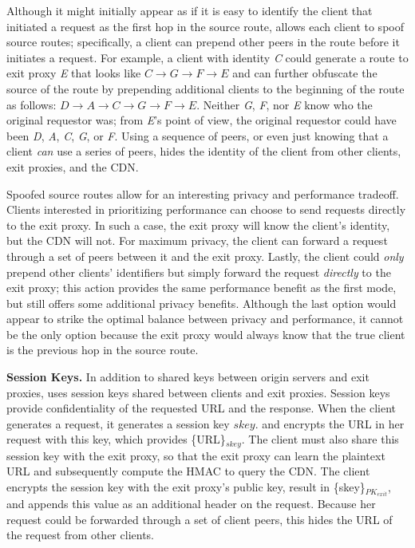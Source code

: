 Although it might initially appear as if it is easy to identify the client
that initiated a request as the first hop in the source route, \system{}
allows each client to spoof source routes; specifically, a client can prepend
other peers in the route before it initiates a request.  For example, a client
with identity {\it C} could generate a route to exit proxy {\it E} that looks
like $C \rightarrow G \rightarrow F \rightarrow E$ and can further obfuscate
the source of the route by prepending additional clients to the beginning of
the route as follows: $D \rightarrow A \rightarrow C \rightarrow G \rightarrow
F \rightarrow E$. Neither {\it G}, {\it F}, nor {\it E} know who the original requestor was; from {\it E}'s point of 
view, the original requestor could have been {\it D}, {\it A}, {\it C}, {\it G},
or {\it F}.  Using a sequence of 
peers, or even just knowing that a client {\it can} use a series of peers, hides
the identity of the client 
from other clients, exit proxies, and the CDN. 

Spoofed source routes allow for an interesting privacy and performance tradeoff. Clients interested in prioritizing performance can choose to send requests directly to the exit proxy. In such a case, the exit proxy will know the client's identity, but the CDN will not. For maximum privacy, the client can forward a request through a set of peers between it and the exit proxy. Lastly, the client could {\it only} prepend other clients' identifiers but simply forward the request {\em directly} to the exit proxy; this action provides the same performance benefit as the first mode, but still offers some additional privacy benefits. Although the last option would appear to strike the optimal balance between privacy and performance, it cannot be the only option because the exit proxy would always know that the true client is the previous hop in the source route. %


\textbf{Session Keys.}
In addition to shared keys between origin servers and exit proxies, \system{} uses session keys shared 
between clients and exit proxies.  Session keys provide confidentiality of the requested URL and the 
response.  When the client generates a request, it generates a session key $skey$.
and encrypts 
the URL in her request with this key, which provides \{URL\}$_{skey}$.  The client
must also share this session key
with the exit proxy, so that the exit proxy can learn the plaintext URL and subsequently compute the HMAC to 
query the CDN.  The client encrypts the session key with the exit proxy's public key, result in \{skey\}$_{PK_{exit}}$, 
and appends this value as an additional header on the request.  Because her request
could be forwarded through 
a set of client peers, this hides the URL of the request from other clients.

